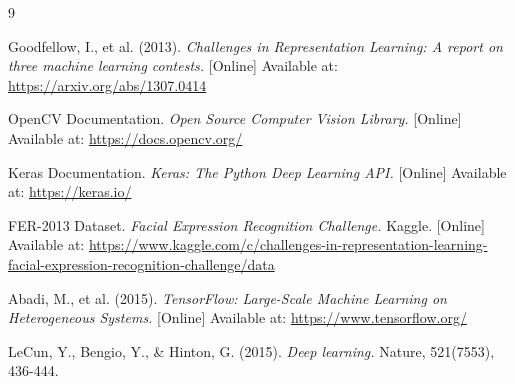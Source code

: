 \documentclass[12pt,a4paper]{report}
\begin{document}
\newpage
{}
\begin{thebibliography}{9}

    Goodfellow, I., et al. (2013). 
    \textit{Challenges in Representation Learning: A report on three machine learning contests.}
    [Online] Available at: \url{https://arxiv.org/abs/1307.0414}

    OpenCV Documentation.
    \textit{Open Source Computer Vision Library.}
    [Online] Available at: \url{https://docs.opencv.org/}

    Keras Documentation.
    \textit{Keras: The Python Deep Learning API.}
    [Online] Available at: \url{https://keras.io/}

    FER-2013 Dataset.
    \textit{Facial Expression Recognition Challenge.}
    Kaggle. [Online] Available at: \url{https://www.kaggle.com/c/challenges-in-representation-learning-facial-expression-recognition-challenge/data}

    Abadi, M., et al. (2015).
    \textit{TensorFlow: Large-Scale Machine Learning on Heterogeneous Systems.}
    [Online] Available at: \url{https://www.tensorflow.org/}

    LeCun, Y., Bengio, Y., \& Hinton, G. (2015).
    \textit{Deep learning.} Nature, 521(7553), 436-444.

\end{thebibliography}
\end{document}
